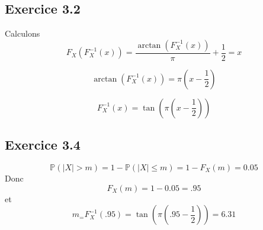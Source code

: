\documentclass[]{book}
\theoremstyle{definition}
\newcommand{\bb}[1]{\mathbb{#1}}
\newcommand{\Pe}{\bb{P}}
\begin{document}
\subsection*{Exercice 3.2}
Calculons 
$$
F_{X}(F_X^{-1}(x)) = \frac{\arctan(F_X^{-1}(x))}{\pi}+\frac{1}{2} = x
$$

$$
\arctan(F_X^{-1}(x)) = \pi(x-\frac{1}{2})
$$

$$
F_X^{-1}(x) = \tan\left(\pi\left(x-\frac{1}{2}\right)\right)
$$


\subsection*{Exercice 3.4}
$$
\Pe(|X| > m) = 1 - \Pe(|X| \leq m) = 1 - F_X(m) = 0.05
$$
Donc
$$
F_X(m) = 1 - 0.05 = .95
$$
et
$$
m_ = F_X^{-1}(.95) = \tan\left(\pi\left(.95-\frac{1}{2}\right)\right) = 6.31
$$
\end{document}
